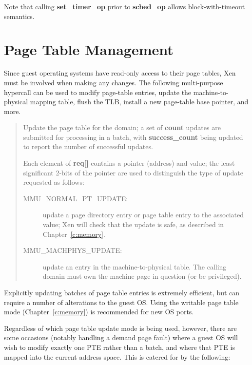\documentclass[11pt,twoside,final,openright,a4paper]{report}
\newcommand{\hypercall}[1]{\vspace{2mm}{\sf #1}}
\begin{document}
Note that calling {\bf set\_timer\_op} prior to {\bf sched\_op} 
allows block-with-timeout semantics. 


\section{Page Table Management} 

Since guest operating systems have read-only access to their page 
tables, Xen must be involved when making any changes. The following
multi-purpose hypercall can be used to modify page-table entries, 
update the machine-to-physical mapping table, flush the TLB, install 
a new page-table base pointer, and more.

\begin{quote} 
\hypercall{mmu\_update(mmu\_update\_t *req, int count, int *success\_count)} 

Update the page table for the domain; a set of {\bf count} updates are
submitted for processing in a batch, with {\bf success\_count} being 
updated to report the number of successful updates.  

Each element of {\bf req[]} contains a pointer (address) and value; 
the least significant 2-bits of the pointer are used to distinguish 
the type of update requested as follows:
\begin{description} 

\item[MMU\_NORMAL\_PT\_UPDATE:] update a page directory entry or
page table entry to the associated value; Xen will check that the
update is safe, as described in Chapter~\ref{c:memory}.

\item[MMU\_MACHPHYS\_UPDATE:] update an entry in the
  machine-to-physical table. The calling domain must own the machine
  page in question (or be privileged).
\end{description}

\end{quote}

Explicitly updating batches of page table entries is extremely
efficient, but can require a number of alterations to the guest
OS. Using the writable page table mode (Chapter~\ref{c:memory}) is
recommended for new OS ports.

Regardless of which page table update mode is being used, however,
there are some occasions (notably handling a demand page fault) where
a guest OS will wish to modify exactly one PTE rather than a
batch, and where that PTE is mapped into the current address space.
This is catered for by the following:
\end{document}
